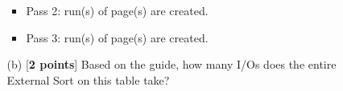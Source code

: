 \documentclass[10pt]{article}
\begin{document}
\begin{enumerate}
\begin{enumerate}
\begin{itemize}
                \item Pass 2: \underline{\quad\quad\quad\quad} run(s) of \underline{\quad\quad\quad\quad} page(s) are created.\\
                \item Pass 3: \underline{\quad\quad\quad\quad} run(s) of \underline{\quad\quad\quad\quad} page(s) are created.\\
            \end{itemize}
            \item[(b)][\textbf{2 points}] Based on the guide, how many I/Os does the entire External Sort on this table take?
            \\
            \\
            \\
            \\
            \\
        \end{enumerate}


\end{enumerate}
\end{document}
